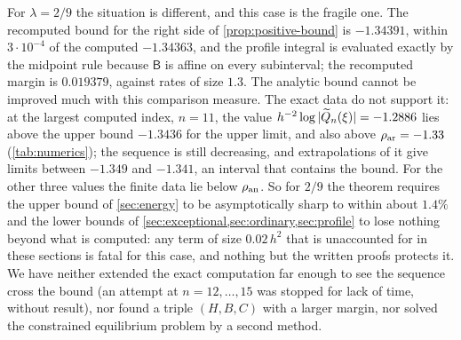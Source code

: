 For $\lambda=2/9$ the situation is different, and this case is the fragile one. The recomputed bound for the right side of \cref{prop:positive-bound} is $-1.34391$, within $3\cdot10^{-4}$ of the computed $-1.34363$, and the profile integral is evaluated exactly by the midpoint rule because $\mathsf B$ is affine on every subinterval; the recomputed margin is $0.019379$, against rates of size $1.3$. The analytic bound cannot be improved much with this comparison measure. The exact data do not support it: at the largest computed index, $n=11$, the value $h^{-2}\log|\widetilde{Q}_n(\xi)|=-1.2886$ lies above the upper bound $-1.3436$ for the upper limit, and also above $\rho_{\mathrm{ar}}=-1.33$ (\cref{tab:numerics}); the sequence is still decreasing, and extrapolations of it give limits between $-1.349$ and $-1.341$, an interval that contains the bound. For the other three values the finite data lie below $\rho_{\mathrm{an}}$. So for $2/9$ the theorem requires the upper bound of \cref{sec:energy} to be asymptotically sharp to within about $1.4\%$ and the lower bounds of \cref{sec:exceptional,sec:ordinary,sec:profile} to lose nothing beyond what is computed: any term of size $0.02\,h^2$ that is unaccounted for in these sections is fatal for this case, and nothing but the written proofs protects it. We have neither extended the exact computation far enough to see the sequence cross the bound (an attempt at $n=12,\dots,15$ was stopped for lack of time, without result), nor found a triple $(H,B,C)$ with a larger margin, nor solved the constrained equilibrium problem by a second method.

